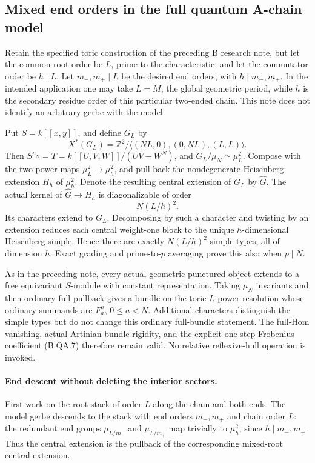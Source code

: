 \subsection*{Mixed end orders in the full quantum A-chain model}

Retain the specified toric construction of the preceding B research note,
but let the common root order be $L$, prime to the characteristic, and
let the commutator order be $h\mid L$.  Let $m_-,m_+\mid L$ be the
desired end orders, with $h\mid m_-,m_+$.  In the intended application
one may take $L=M$, the global geometric period, while $h$ is the
secondary residue order of this particular two-ended chain.  This note
does not identify an arbitrary gerbe with the model.

Put $S=k[[x,y]]$, and define $G_L$ by
\[
 X^*(G_L)=\mathbb Z^2/
             \langle(NL,0),(0,NL),(L,L)\rangle.
\]
Then $S^{\mu_N}=T=k[[U,V,W]]/(UV-W^N)$, and
$G_L/\mu_N\simeq\mu_L^2$.  Compose with the two power maps
$\mu_L^2\to\mu_h^2$, and pull back the nondegenerate Heisenberg
extension $H_h$ of $\mu_h^2$.  Denote the resulting central extension
of $G_L$ by $\widehat G$.  The actual kernel of
$\widehat G\to H_h$ is diagonalizable of order
\[
                              N(L/h)^2.                \tag{B.ME.1}
\]
Its characters extend to $G_L$.  Decomposing by such a character and
twisting by an extension reduces each central weight-one block to the
unique $h$-dimensional Heisenberg simple.  Hence there are exactly
$N(L/h)^2$ simple types, all of dimension $h$.  Exact grading and
prime-to-$p$ averaging prove this also when $p\mid N$.

As in the preceding note, every actual geometric punctured object
extends to a free equivariant $S$-module with constant representation.
Taking $\mu_N$ invariants and then ordinary full pullback gives a bundle
on the toric $L$-power resolution whose ordinary summands are
$F_a^h$, $0\le a<N$.  Additional characters distinguish the simple
types but do not change this ordinary full-bundle statement.
The full-Hom vanishing, actual Artinian bundle rigidity, and the
explicit one-step Frobenius coefficient (B.QA.7) therefore remain
valid.  No relative reflexive-hull operation is invoked.

\paragraph{End descent without deleting the interior sectors.}
First work on the root stack of order $L$ along the chain and both
ends.  The model gerbe descends to the stack with end orders
$m_-,m_+$ and chain order $L$: the redundant end groups
$\mu_{L/m_-}$ and $\mu_{L/m_+}$ map trivially to $\mu_h^2$, since
$h\mid m_-,m_+$.  Thus the central extension is the pullback of the
corresponding mixed-root central extension.

